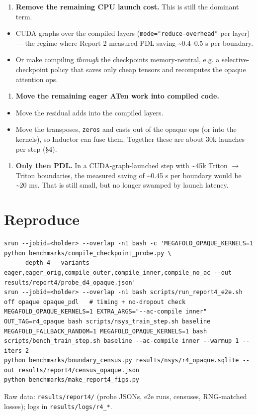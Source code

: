 \documentclass[10pt]{article}
\begin{document}
\begin{enumerate}
\item \textbf{Remove the remaining CPU launch cost.} This is still the dominant term.
\end{enumerate}
\begin{itemize}
\item CUDA graphs over the compiled layers (\texttt{mode="reduce-overhead"} per layer) --- the regime where Report 2 measured PDL saving \textasciitilde{}0.4--0.5 \textmu{}s per boundary.
\item Or make compiling \emph{through} the checkpoints memory-neutral, e.g. a selective-checkpoint policy that saves only cheap tensors and recomputes the opaque attention ops.
\end{itemize}
\begin{enumerate}
\item \textbf{Move the remaining eager ATen work into compiled code.}
\end{enumerate}
\begin{itemize}
\item Move the residual adds into the compiled layers.
\item Move the transposes, \texttt{zeros} and casts out of the opaque ops (or into the kernels), so Inductor can fuse them. Together these are about 30k launches per step (\S{}4).
\end{itemize}
\begin{enumerate}
\item \textbf{Only then PDL.} In a CUDA-graph-launched step with \textasciitilde{}45k Triton $\rightarrow$ Triton boundaries, the measured saving of \textasciitilde{}0.45 \textmu{}s per boundary would be \textasciitilde{}20 ms. That is still small, but no longer swamped by launch latency.
\end{enumerate}

\section{Reproduce}

\begin{lstlisting}
srun --jobid=<holder> --overlap -n1 bash -c 'MEGAFOLD_OPAQUE_KERNELS=1 python benchmarks/compile_checkpoint_probe.py \
    --depth 4 --variants eager,eager_orig,compile_outer,compile_inner,compile_no_ac --out results/report4/probe_d4_opaque.json'
srun --jobid=<holder> --overlap -n1 bash scripts/run_report4_e2e.sh off opaque opaque_pdl   # timing + no-dropout check
MEGAFOLD_OPAQUE_KERNELS=1 EXTRA_ARGS="--ac-compile inner" OUT_TAG=r4_opaque bash scripts/nsys_train_step.sh baseline
MEGAFOLD_FALLBACK_RANDOM=1 MEGAFOLD_OPAQUE_KERNELS=1 bash scripts/bench_train_step.sh baseline --ac-compile inner --warmup 1 --iters 2
python benchmarks/boundary_census.py results/nsys/r4_opaque.sqlite --out results/report4/census_opaque.json
python benchmarks/make_report4_figs.py
\end{lstlisting}
Raw data: \texttt{results/report4/} (probe JSONs, e2e runs, censuses, RNG-matched losses); logs in \texttt{results/logs/r4\_*}.
\end{document}
